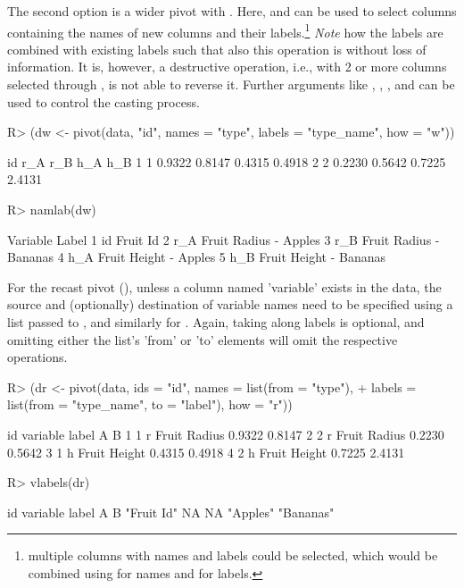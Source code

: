 \documentclass[article]{jss}
\newcommand{\fct}[1]{\code{#1()}}
\begin{document}
The second option is a wider pivot with . Here,  and  can be used to select columns containing the names of new columns and their labels.\footnote{multiple columns with names and labels could be selected, which would be combined using  for names and  for labels.} \emph{Note} how the labels are combined with existing labels such that also this operation is without loss of information. It is, however, a destructive operation, i.e., with 2 or more columns selected through , \fct{pivot} is not able to reverse it. Further arguments like , , , and  can be used to control the casting process.
%
\begin{Schunk}
\begin{Sinput}
R> (dw <- pivot(data, "id", names = "type", labels = "type_name", how = "w"))
\end{Sinput}
\begin{Soutput}
  id    r_A    r_B    h_A    h_B
1  1 0.9322 0.8147 0.4315 0.4918
2  2 0.2230 0.5642 0.7225 2.4131
\end{Soutput}
\begin{Sinput}
R> namlab(dw)
\end{Sinput}
\begin{Soutput}
  Variable                  Label
1       id               Fruit Id
2      r_A  Fruit Radius - Apples
3      r_B Fruit Radius - Bananas
4      h_A  Fruit Height - Apples
5      h_B Fruit Height - Bananas
\end{Soutput}
\end{Schunk}
%
For the recast pivot (), unless a column named 'variable' exists in the data, the source and (optionally) destination of variable names need to be specified using a list passed to , and similarly for . Again, taking along labels is optional, and omitting either the list's 'from' or 'to' elements will omit the respective operations.
%
\begin{Schunk}
\begin{Sinput}
R> (dr <- pivot(data, ids = "id", names = list(from = "type"),
+               labels = list(from = "type_name", to = "label"), how = "r"))
\end{Sinput}
\begin{Soutput}
  id variable        label      A      B
1  1        r Fruit Radius 0.9322 0.8147
2  2        r Fruit Radius 0.2230 0.5642
3  1        h Fruit Height 0.4315 0.4918
4  2        h Fruit Height 0.7225 2.4131
\end{Soutput}
\begin{Sinput}
R> vlabels(dr)
\end{Sinput}
\begin{Soutput}
        id   variable      label          A          B 
"Fruit Id"         NA         NA   "Apples"  "Bananas" 
\end{Soutput}
\end{Schunk}
\end{document}
